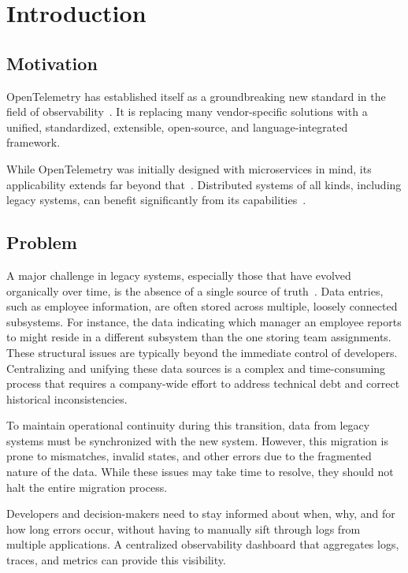 \chapter{Introduction}

\section{Motivation}

OpenTelemetry has established itself as a groundbreaking new standard in the field of observability~\cite{Young2024, Young2021}.
It is replacing many vendor-specific solutions with a unified, standardized, extensible, open-source, 
and language-integrated framework.

While OpenTelemetry was initially designed with microservices in mind, its applicability extends far beyond that~\cite{Boten2022}.
Distributed systems of all kinds, including legacy systems, can benefit significantly from its capabilities~\cite{Gomez_Blanco2023}.

\section{Problem}

A major challenge in legacy systems, especially those that have evolved organically over time,
is the absence of a single source of truth~\cite{Flanders2024}.
Data entries, such as employee information, are often stored across multiple, loosely connected subsystems.
For instance, the data indicating which manager an employee reports to might reside in a
different subsystem than the one storing team assignments.
These structural issues are typically beyond the immediate control of developers.
Centralizing and unifying these data sources is a complex and time-consuming process
that requires a company-wide effort to address technical debt and correct historical inconsistencies.

To maintain operational continuity during this transition, data from legacy systems must be synchronized with the new system.
However, this migration is prone to mismatches, invalid states, and other errors due to the fragmented nature of the data.
While these issues may take time to resolve, they should not halt the entire migration process.

Developers and decision-makers need to stay informed about when, why, and for how long errors
occur, without having to manually sift through logs from multiple applications.
A centralized observability dashboard that aggregates logs, traces, and metrics can provide this visibility.


